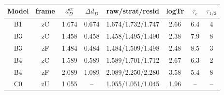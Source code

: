 \begingroup\setlength{\tabcolsep}{5pt}\small\begin{tabular}{@{}cccccccc@{}}
\toprule
Model & frame & $d_D^{ev}$ & $\Delta d_D$ & raw/strat/resid & logTr & $\tau_{e}$ & $\tau_{1/2}$ \\
\midrule
B1 & zC & 1.674 & 0.674 & 1.674/1.732/1.747 & 2.66 & 6.4 & 4 \\
B3 & zC & 1.458 & 0.458 & 1.458/1.495/1.490 & 2.38 & 7.9 & 8 \\
B3 & zF & 1.484 & 0.484 & 1.484/1.509/1.498 & 2.48 & 8.5 & 3 \\
B4 & zC & 1.589 & 0.589 & 1.589/1.701/1.712 & 2.67 & 6.3 & 2 \\
B4 & zF & 2.089 & 1.089 & 2.089/2.250/2.280 & 3.58 & 5.4 & 8 \\
C0 & zU & 1.055 & -- & 1.055/1.051/1.045 & 1.96 & -- & -- \\
\bottomrule
\end{tabular}\endgroup
